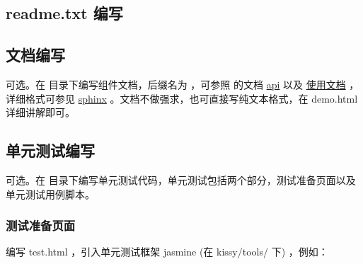 \documentclass[letterpaper,10pt,english]{sphinxmanual}
\begin{document}
\subsection{readme.txt 编写}
\label{workflow/dev-spec:readme-txt}

\subsection{文档编写}
\label{workflow/dev-spec:id3}
可选。在  目录下编写组件文档，后缀名为  ，可参照  的文档 \href{http://docs.kissyui.com/source/component/overlay/index.rst}{api}  以及
\href{http://docs.kissyui.com/source/component/overlay/usage.rst}{使用文档} ，详细格式可参见 \href{http://sphinx.pocoo.org/}{sphinx} 。文档不做强求，也可直接写纯文本格式，在 demo.html 详细讲解即可。


\subsection{单元测试编写}
\label{workflow/dev-spec:id6}
可选。在  目录下编写单元测试代码，单元测试包括两个部分，测试准备页面以及单元测试用例脚本。


\subsubsection{测试准备页面}
\label{workflow/dev-spec:id7}
编写 test.html ，引入单元测试框架 jasmine (在 kissy/tools/ 下) ，例如：
\end{document}
